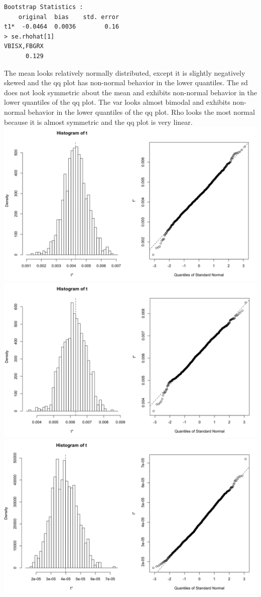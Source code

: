 \documentclass[letterpaper,12pt]{article}
\begin{document}
\begin{enumerate}
\begin{lstlisting}
Bootstrap Statistics :
    original  bias    std. error
t1*  -0.0464  0.0036        0.16
> se.rhohat[1]
VBISX,FBGRX 
      0.129 
\end{lstlisting}
 The mean looks relatively normally distributed, except it is slightly negatively skewed and the qq plot has non-normal behavior in the lower quantiles. The sd does not look symmetric about the mean and exhibits non-normal behavior in the lower quantiles of the qq plot. The var looks almost bimodal and exhibits non-normal behavior in the lower quantiles of the qq plot. Rho looks the most normal because it is almost symmetric and the qq plot is very linear. \\ 
\includegraphics[scale = 0.3]{mean} \\ 
\includegraphics[scale = 0.3]{sd} \\
\includegraphics[scale = 0.3]{var} \\

\end{enumerate}
\end{document}
